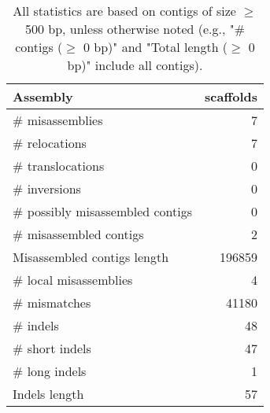 \documentclass[12pt,a4paper]{article}
\begin{document}
\begin{table}[ht]
\begin{center}
\caption{All statistics are based on contigs of size $\geq$ 500 bp, unless otherwise noted (e.g., "\# contigs ($\geq$ 0 bp)" and "Total length ($\geq$ 0 bp)" include all contigs).}
\begin{tabular}{|l*{1}{|r}|}
\hline
Assembly & scaffolds \\ \hline
\# misassemblies & 7 \\ \hline
\hspace{5mm}\# relocations & 7 \\ \hline
\hspace{5mm}\# translocations & 0 \\ \hline
\hspace{5mm}\# inversions & 0 \\ \hline
\# possibly misassembled contigs & 0 \\ \hline
\# misassembled contigs & 2 \\ \hline
Misassembled contigs length & 196859 \\ \hline
\# local misassemblies & 4 \\ \hline
\# mismatches & 41180 \\ \hline
\# indels & 48 \\ \hline
\hspace{5mm}\# short indels & 47 \\ \hline
\hspace{5mm}\# long indels & 1 \\ \hline
Indels length & 57 \\ \hline
\end{tabular}
\end{center}
\end{table}
\end{document}
